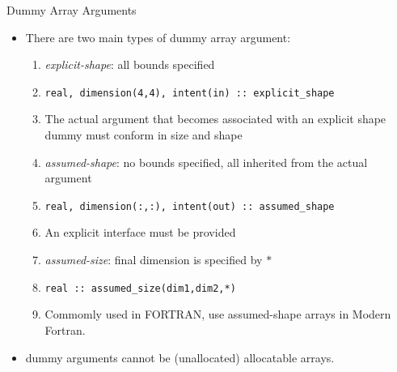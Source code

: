\documentclass[10pt,t]{beamer}
\begin{document}
\begin{frame}[fragile]{Dummy Array Arguments}
  \begin{itemize}
    \item There are two main types of dummy array argument:
    \begin{enumerate}
      \item \textit{explicit-shape}: all bounds specified
      \item[] \lstinline[language={[90]Fortran},basicstyle=\fontsize{7}{8}\selectfont\ttfamily]{real, dimension(4,4), intent(in) :: explicit_shape}
      \item[] The actual argument that becomes associated with an explicit shape dummy must conform in size and shape
      \item \textit{assumed-shape}: no bounds specified, all inherited from the actual argument
      \item[] \lstinline[language={[90]Fortran},basicstyle=\fontsize{7}{8}\selectfont\ttfamily]{real, dimension(:,:), intent(out) :: assumed_shape}
      \item[] An explicit interface must be provided
      \item \textit{assumed-size}: final dimension is specified by $\ast$
      \item[] \lstinline[language={[90]Fortran},basicstyle=\fontsize{7}{8}\selectfont\ttfamily]{real :: assumed_size(dim1,dim2,*)}
      \item[] Commomly used in FORTRAN, use assumed-shape arrays in Modern Fortran.
    \end{enumerate}
    \item dummy arguments cannot be (unallocated) allocatable arrays.
  \end{itemize}
\end{frame}
\end{document}
